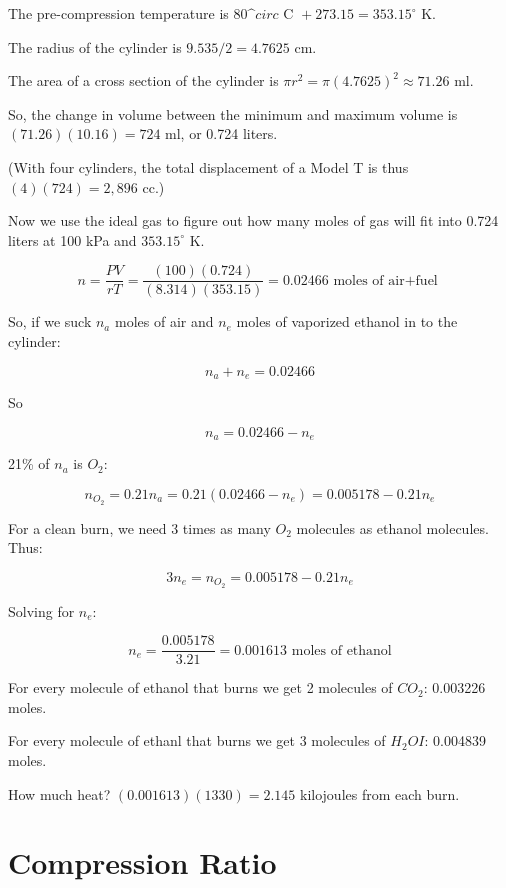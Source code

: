 \begin{Answer}[ref=fuelmix] 

The pre-compression temperature is $80\^circ \text{ C } + 273.15 = 353.15^\circ$ K.

The radius of the cylinder is $9.535/2 =4.7625$ cm.

The area of a cross section of the cylinder is $\pi r^2 = \pi (4.7625)^2 \approx 71.26$ ml.

So, the change in volume between the minimum and maximum volume is $ (71.26)(10.16) = 724$ ml, or 0.724 liters.

(With four cylinders,  the total displacement of a Model T is thus $ (4)(724) = 2,896$ cc.)

Now we use the ideal gas to figure out how many moles of gas will fit into 0.724 liters at 100 kPa and $353.15^\circ$ K.

$$n = \frac{PV}{rT} = \frac{(100)(0.724)}{(8.314)(353.15)} = 0.02466 \text{ moles of air+fuel }$$ 

So,  if we suck $n_a$ moles of air and $n_e$ moles of vaporized ethanol in to the cylinder:

$$n_a + n_e = 0.02466$$

So

$$n_a = 0.02466 -  n_e$$

21\% of $n_a$ is $O_2$:

$$n_{O_2} = 0.21 n_a = 0.21 (0.02466 -  n_e) = 0.005178 - 0.21 n_e$$

For a clean burn,  we need 3 times as many $O_2$ molecules as ethanol molecules.  Thus:

$$3 n_e  =   n_{O_2} = 0.005178 - 0.21 n_e$$

Solving for $n_e$:

$$n_e = \frac{0.005178}{3.21}  = 0.001613 \text{ moles  of ethanol}$$

For every molecule of ethanol that burns we get 2 molecules of $CO_2$: 0.003226 moles.

For every molecule of ethanl that burns we get 3 molecules of $H_2OI$: 0.004839 moles.

How much heat?  $(0.001613)(1330) =  2.145$ kilojoules from each burn.

\end{Answer}

\section{Compression Ratio}


